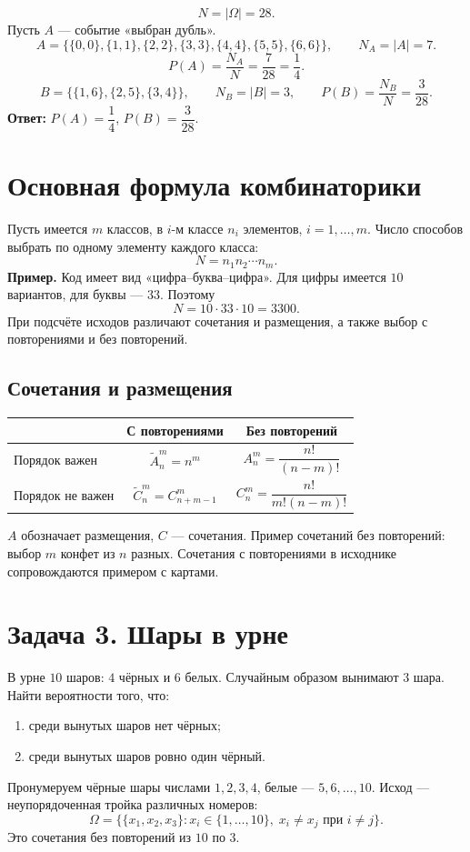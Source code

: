 \[
 N=|\Omega|=28.
\]
Пусть $A$ --- событие «выбран дубль».
\[
 A=\bigl\{\{0,0\},\{1,1\},\{2,2\},\{3,3\},\{4,4\},\{5,5\},\{6,6\}\bigr\},
 \qquad N_A=|A|=7.
\]
\[
 P(A)=\frac{N_A}{N}=\frac7{28}=\frac14.
\]
\[
 B=\bigl\{\{1,6\},\{2,5\},\{3,4\}\bigr\},\qquad N_B=|B|=3,
 \qquad P(B)=\frac{N_B}{N}=\frac3{28}.
\]
\textbf{Ответ:} $P(A)=\dfrac14$, $P(B)=\dfrac3{28}$.

\section*{Основная формула комбинаторики}
Пусть имеется $m$ классов, в $i$-м классе $n_i$ элементов,
$i=1,\ldots,m$. Число способов выбрать по одному элементу каждого класса:
\[
 \boxed{N=n_1n_2\cdots n_m.}
\]
\textbf{Пример.} Код имеет вид «цифра--буква--цифра».
Для цифры имеется $10$ вариантов, для буквы --- $33$. Поэтому
\[
 N=10\cdot33\cdot10=3300.
\]
При подсчёте исходов различают сочетания и размещения, а также
выбор с повторениями и без повторений.

\subsection*{Сочетания и размещения}
\begin{center}
\renewcommand{\arraystretch}{1.8}
\begin{tabular}{|l|c|c|}
\hline
 & С повторениями & Без повторений \\
\hline
Порядок важен & $\widetilde A_n^m=n^m$ & $A_n^m=\dfrac{n!}{(n-m)!}$ \\
\hline
Порядок не важен & $\widetilde C_n^m=C_{n+m-1}^m$ & $C_n^m=\dfrac{n!}{m!(n-m)!}$ \\
\hline
\end{tabular}
\end{center}
$A$ обозначает размещения, $C$ --- сочетания.
Пример сочетаний без повторений: выбор $m$ конфет из $n$ разных.
Сочетания с повторениями в исходнике сопровождаются примером с картами.

\section*{Задача 3. Шары в урне}
В урне $10$ шаров: $4$ чёрных и $6$ белых. Случайным образом
вынимают $3$ шара. Найти вероятности того, что:
\begin{enumerate}
 \item среди вынутых шаров нет чёрных;
 \item среди вынутых шаров ровно один чёрный.
\end{enumerate}
Пронумеруем чёрные шары числами $1,2,3,4$, белые --- $5,6,\ldots,10$.
Исход --- неупорядоченная тройка различных номеров:
\[
 \Omega=\bigl\{\{x_1,x_2,x_3\}:x_i\in\{1,\ldots,10\},\;
 x_i\ne x_j\text{ при }i\ne j\bigr\}.
\]
Это сочетания без повторений из $10$ по $3$.

